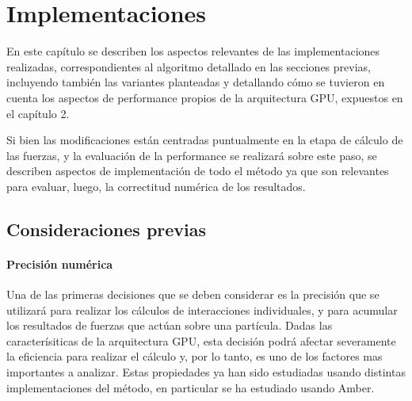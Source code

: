 \chapter{Implementaciones}

En este capítulo se describen los aspectos relevantes de las implementaciones realizadas, correspondientes al algoritmo detallado en las secciones previas, incluyendo también las variantes planteadas y
detallando cómo se tuvieron en cuenta los aspectos de performance propios de la arquitectura GPU, expuestos en el capítulo 2.

Si bien las modificaciones están centradas puntualmente en la etapa de cálculo de las fuerzas, y la evaluación de la performance se realizará sobre este paso,
se describen aspectos de implementación de todo el método ya que son relevantes para evaluar, luego, la correctitud numérica de los resultados.



\section{Consideraciones previas}

\subsubsection{Precisión numérica}

Una de las primeras decisiones que se deben considerar es la precisión que se utilizará para realizar los cálculos de interacciones individuales, y para acumular los resultados de fuerzas que actúan sobre una partícula. 
Dadas las caracterísiticas de la arquitectura GPU, esta decisión podrá afectar severamente la eficiencia para realizar el cálculo y, por lo tanto, es uno de los factores mas importantes a analizar.
Estas propiedades ya han sido estudiadas usando distintas implementaciones del método, en particular se ha estudiado usando Amber\cite{le2013spfp}. 

